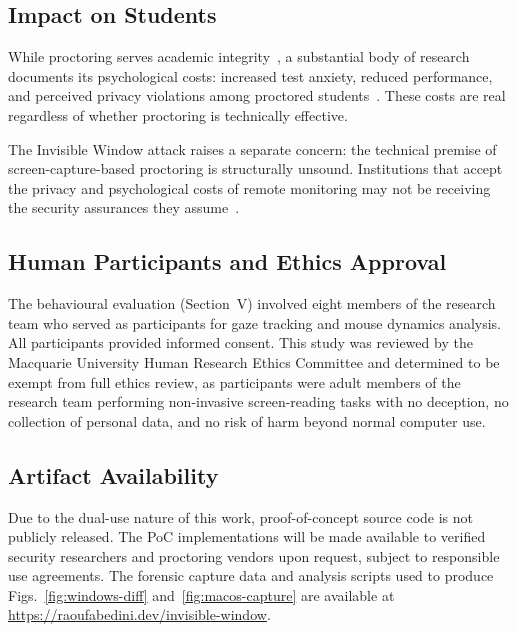\documentclass[conference]{IEEEtran}
\begin{document}
\subsection{Impact on Students}

While proctoring serves academic integrity~\cite{lee2022online,noordegraaf2023ethical}, a substantial body of research documents its psychological costs: increased test anxiety, reduced performance, and perceived privacy violations among proctored students~\cite{conijn2022fear,ruth2024cheating,gribbins2023exploration}. These costs are real regardless of whether proctoring is technically effective.

The Invisible Window attack raises a separate concern: the technical premise of screen-capture-based proctoring is structurally unsound. Institutions that accept the privacy and psychological costs of remote monitoring may not be receiving the security assurances they assume~\cite{khalil2022nexus,prinsloo2024vulnerable}.

\subsection{Human Participants and Ethics Approval}

The behavioural evaluation (Section~V) involved eight members of the research team who served as participants for gaze tracking and mouse dynamics analysis. All participants provided informed consent. This study was reviewed by the Macquarie University Human Research Ethics Committee and determined to be exempt from full ethics review, as participants were adult members of the research team performing non-invasive screen-reading tasks with no deception, no collection of personal data, and no risk of harm beyond normal computer use.

\subsection{Artifact Availability}

Due to the dual-use nature of this work, proof-of-concept source code is not publicly released. The PoC implementations will be made available to verified security researchers and proctoring vendors upon request, subject to responsible use agreements. The forensic capture data and analysis scripts used to produce Figs.~\ref{fig:windows-diff} and~\ref{fig:macos-capture} are available at \url{https://raoufabedini.dev/invisible-window}.

\end{document}
